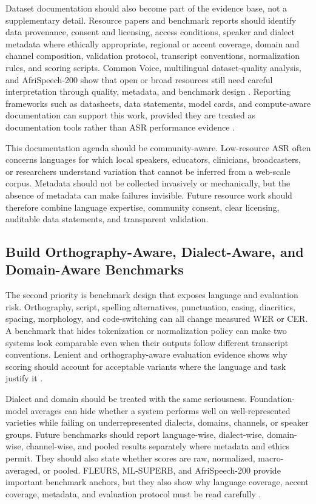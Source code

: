 \documentclass[pdflatex,sn-basic,iicol]{sn-jnl}
\theoremstyle{thmstyleone}
\theoremstyle{thmstyletwo}
\theoremstyle{thmstylethree}
\begin{document}
Dataset documentation should also become part of the evidence base, not a supplementary detail. Resource papers and benchmark reports should identify data provenance, consent and licensing, access conditions, speaker and dialect metadata where ethically appropriate, regional or accent coverage, domain and channel composition, validation protocol, transcript conventions, normalization rules, and scoring scripts. Common Voice, multilingual dataset-quality analysis, and AfriSpeech-200 show that open or broad resources still need careful interpretation through quality, metadata, and benchmark design \citep{ardila2020commonvoice,lau2025_data_quality_multilingual_speech,olatunji2023_afrispeech200}. Reporting frameworks such as datasheets, data statements, model cards, and compute-aware documentation can support this work, provided they are treated as documentation tools rather than ASR performance evidence \citep{gebru2021_datasheets_for_datasets,bender2018_data_statements,mitchell2019_model_cards,strubell2019_energy_policy}.

This documentation agenda should be community-aware. Low-resource ASR often concerns languages for which local speakers, educators, clinicians, broadcasters, or researchers understand variation that cannot be inferred from a web-scale corpus. Metadata should not be collected invasively or mechanically, but the absence of metadata can make failures invisible. Future resource work should therefore combine language expertise, community consent, clear licensing, auditable data statements, and transparent validation.

\subsection{Build Orthography-Aware, Dialect-Aware, and Domain-Aware Benchmarks}

The second priority is benchmark design that exposes language and evaluation risk. Orthography, script, spelling alternatives, punctuation, casing, diacritics, spacing, morphology, and code-switching can all change measured WER or CER. A benchmark that hides tokenization or normalization policy can make two systems look comparable even when their outputs follow different transcript conventions. Lenient and orthography-aware evaluation evidence shows why scoring should account for acceptable variants where the language and task justify it \citep{karita2023lenient}.

Dialect and domain should be treated with the same seriousness. Foundation-model averages can hide whether a system performs well on well-represented varieties while failing on underrepresented dialects, domains, channels, or speaker groups. Future benchmarks should report language-wise, dialect-wise, domain-wise, channel-wise, and pooled results separately where metadata and ethics permit. They should also state whether scores are raw, normalized, macro-averaged, or pooled. FLEURS, ML-SUPERB, and AfriSpeech-200 provide important benchmark anchors, but they also show why language coverage, accent coverage, metadata, and evaluation protocol must be read carefully \citep{conneau2022fleurs,shi2023mlsuperb,olatunji2023_afrispeech200}.
\end{document}
